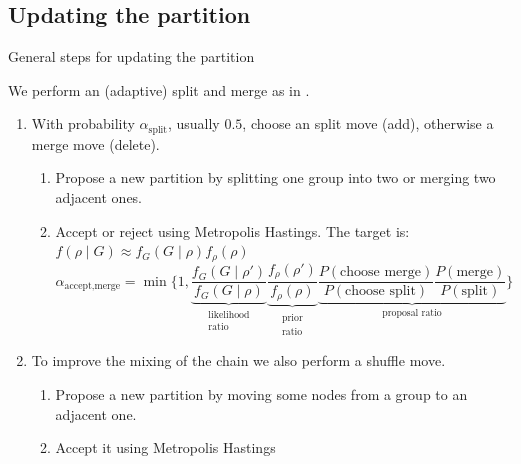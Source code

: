 \subsection{Updating the partition}


\begin{frame}{General steps for updating the partition}
    
    We perform an (adaptive) \alert{split and merge} as in \cite{bensonAdaptiveMCMCMultiple2018}.
    \begin{enumerate}
        \item With probability $\alpha_{\text{split}}$, usually $0.5$, choose an \alert{split move (add)}, otherwise a \alert{merge move (delete)}.
        \begin{enumerate}
            \item Propose a new partition by splitting one group into two or merging two adjacent ones.
            \item Accept or reject using Metropolis Hastings. The target is:
            $f(\rho \mid G) \approx f_G(G \mid \rho) f_{\rho}(\rho)$
            \[
                \alpha_{\text{accept,merge}} = \min %
                \bigg\{1,
                \underbrace{\frac{f_G\left(G \mid \rho'\right)}{f_G(G \mid \rho)}}_{\substack{\text{likelihood}\\\text{ratio}}}
                \underbrace{\frac{f_\rho\left(\rho'\right)}{f_\rho(\rho)}}_{\substack{\text{prior}\\\text{ratio}}}
                \underbrace{\frac{P(\text{choose merge})}{P(\text{choose split})} \frac{P(\text{merge})}{P(\text{split})}}_{\text{proposal ratio}}
                \bigg\}
            \]
        \end{enumerate}
        \item To improve the mixing of the chain we also perform a \alert{shuffle move}.
        \begin{enumerate}
            \item Propose a new partition by moving some nodes from a group to an adjacent one.
            \item Accept it using Metropolis Hastings
        \end{enumerate}

    \end{enumerate}

\end{frame}

